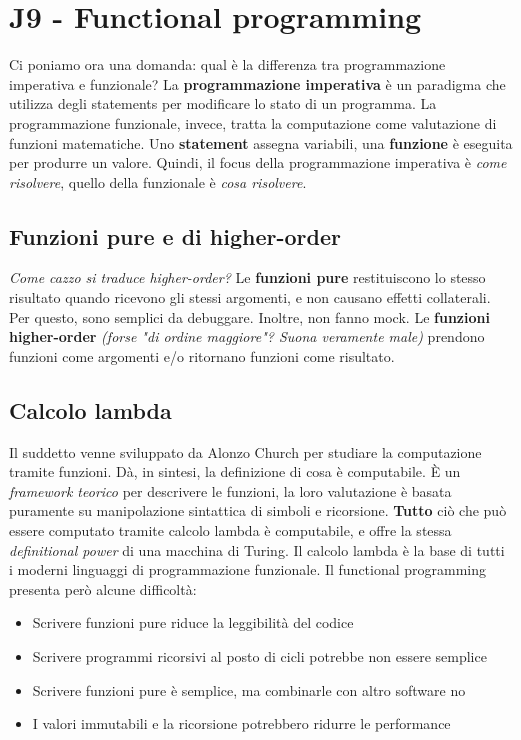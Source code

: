 \documentclass[11pt]{article}
\begin{document}
\section{J9 - Functional programming}
Ci poniamo ora una domanda: qual è la differenza tra programmazione imperativa e funzionale? 
La \textbf{programmazione imperativa} è un paradigma che utilizza degli \glspl{statement} per modificare lo stato di un programma. La programmazione funzionale, invece, tratta la computazione come valutazione di funzioni matematiche. Uno \textbf{\gls{statement}} assegna variabili, una \textbf{funzione} è eseguita per produrre un valore. Quindi, il focus della programmazione imperativa è \textit{come risolvere}, quello della funzionale è \textit{cosa risolvere}.
\subsection{Funzioni pure e di higher-order}
\textit{Come cazzo si traduce higher-order?} Le \textbf{funzioni pure} restituiscono lo stesso risultato quando ricevono gli stessi argomenti, e non causano effetti collaterali. Per questo, sono semplici da debuggare. Inoltre, non fanno \gls{mock}. Le \textbf{funzioni higher-order} \textit{(forse "di ordine maggiore"? Suona veramente male)} prendono funzioni come argomenti e/o ritornano funzioni come risultato. 
\subsection{Calcolo lambda}
Il suddetto venne sviluppato da Alonzo Church per studiare la computazione tramite funzioni. Dà, in sintesi, la definizione di cosa è computabile. È un \textit{framework teorico} per descrivere le funzioni, la loro valutazione è basata puramente su manipolazione sintattica di simboli e ricorsione. \textbf{Tutto} ciò che può essere computato tramite calcolo lambda è computabile, e offre la stessa \textit{definitional power} di una macchina di Turing. Il calcolo lambda è la base di tutti i moderni linguaggi di programmazione funzionale. 
Il functional programming presenta però alcune difficoltà:
\begin{itemize}
    \item Scrivere funzioni pure riduce la leggibilità del codice
    \item Scrivere programmi ricorsivi al posto di cicli potrebbe non essere semplice
    \item Scrivere funzioni pure è semplice, ma combinarle con altro software no
    \item I valori immutabili e la ricorsione potrebbero ridurre le performance
\end{itemize} 
\end{document}
